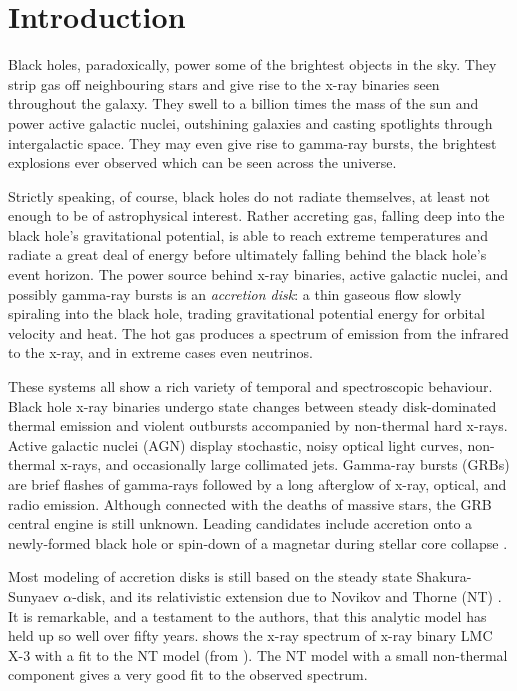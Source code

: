 \chapter*{Introduction}


Black holes, paradoxically, power some of the brightest objects in the sky.  They strip gas off neighbouring stars and give rise to the x-ray binaries seen throughout the galaxy.  They swell to a billion times the mass of the sun and power active galactic nuclei, outshining galaxies and casting spotlights through intergalactic space.  They may even give rise to gamma-ray bursts, the brightest explosions ever observed which can be seen across the universe.

Strictly speaking, of course, black holes do not radiate themselves, at least not enough to be of astrophysical interest.  Rather accreting gas, falling deep into the black hole's gravitational potential, is able to reach extreme temperatures and radiate a great deal of energy before ultimately falling behind the black hole's event horizon.  The power source behind x-ray binaries, active galactic nuclei, and possibly gamma-ray bursts is an \emph{accretion disk}: a thin gaseous flow slowly spiraling into the black hole, trading gravitational potential energy for orbital velocity and heat.  The hot gas produces a spectrum of emission from the infrared to the x-ray, and in extreme cases even neutrinos.

These systems all show a rich variety of temporal and spectroscopic behaviour.  Black hole x-ray binaries undergo state changes between steady disk-dominated thermal emission and violent outbursts accompanied by non-thermal hard x-rays.  Active galactic nuclei (AGN) display stochastic, noisy optical light curves, non-thermal x-rays, and occasionally large collimated jets.  Gamma-ray bursts (GRBs) are brief flashes of gamma-rays followed by a long afterglow of x-ray, optical, and radio emission.  Although connected with the deaths of massive stars, the GRB central engine is still unknown.  Leading candidates include accretion onto a newly-formed black hole or spin-down of a magnetar during stellar core collapse \citep{Duncan92, Woosley93, Usov94, MacFadyen99, Metzger11}.

Most modeling of accretion disks is still based on the steady state Shakura-Sunyaev $\alpha$-disk, and its relativistic extension due to Novikov and Thorne (NT) \citep{ShakuraSunyaev, Novikov73}.  It is remarkable, and a testament to the authors, that this analytic model has held up so well over fifty years.   shows the x-ray spectrum of x-ray binary LMC X-3 with a fit to the NT model (from \citealt{Steiner14}).  The NT model with a small non-thermal component gives a very good fit to the observed spectrum.

